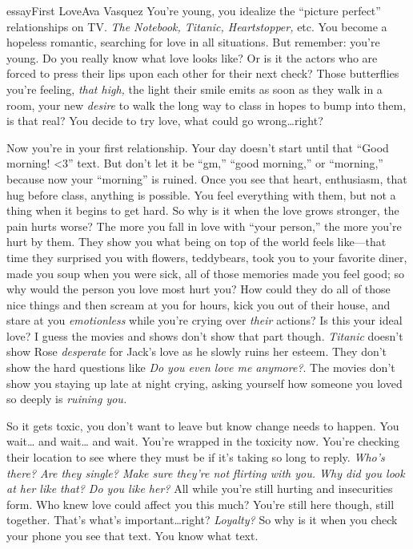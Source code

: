 \begin{prose}{essay}{First Love}{Ava Vasquez}
    You're young, you idealize the “picture perfect” relationships on TV.
    \textit{The Notebook, Titanic, Heartstopper,} etc. You become a hopeless romantic, searching for love in all situations. But remember: you're young. Do you really know what love looks like? Or is it the actors who are forced to press their lips upon each other for their next check? Those butterflies you're feeling, \textit{that high,} the light their smile emits as soon as they walk in a room, your new \textit{desire} to walk the long way to class in hopes to bump into them, is that real? You decide to try love, what could go wrong…right?\par
	Now you're in your first relationship. Your day doesn't start until that “Good morning! <3” text. But don't let it be “gm,” “good morning,” or “morning,” because now your “morning” is ruined. Once you see that heart, enthusiasm, that hug before class, anything is possible. You feel everything with them, but not a thing when it begins to get hard. So why is it when the love grows stronger, the pain hurts worse? The more you fall in love with “your person,” the more you're hurt by them. They show you what being on top of the world feels like—that time they surprised you with flowers, teddybears, took you to your favorite diner, made you soup when you were sick, all of those memories made you feel good; so why would the person you love most hurt you? How could they do all of those nice things and then scream at you for hours, kick you out of their house, and stare at you \textit{emotionless} while you're crying over \textit{their} actions? Is this your ideal love? I guess the movies and shows don't show that part though. \textit{Titanic} doesn't show Rose \textit{desperate} for Jack's love as he slowly ruins her esteem. They don't show the hard questions like \textit{Do you even love me anymore?}. The movies don't show you staying up late at night crying, asking yourself how someone you loved so deeply is \textit{ruining you.}\par
	So it gets toxic, you don't want to leave but know change needs to happen. You wait… and wait… and wait. You're wrapped in the toxicity now. You're checking their location to see where they must be if it's taking so long to reply. \textit{Who's there? Are they single? Make sure they're not flirting with you. Why did you look at her like that? Do you like her?} All while you're still hurting and insecurities form. Who knew love could affect you this much? You're still here though, still together. That's what's important…right? \textit{Loyalty?} So why is it when you check your phone you see that text. You know what text.
\end{prose}

